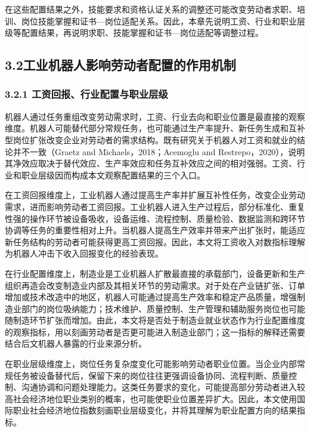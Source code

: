 在这些配置结果之外，技能要求和资格认证关系的调整还可能改变劳动者求职、培训、岗位技能掌握和证书---岗位适配关系。因此，本章先说明工资、行业和职业层级等配置结果，再说明求职、技能掌握和证书---岗位适配等调整过程。

\subsection{3.2工业机器人影响劳动者配置的作用机制}\label{ux5de5ux4e1aux673aux5668ux4ebaux5f71ux54cdux52b3ux52a8ux8005ux914dux7f6eux7684ux4f5cux7528ux673aux5236}

\subsubsection{3.2.1 工资回报、行业配置与职业层级}\label{ux5de5ux8d44ux56deux62a5ux884cux4e1aux914dux7f6eux4e0eux804cux4e1aux5c42ux7ea7}

机器人通过任务重组改变劳动需求时，工资、行业去向和职业位置是最直接的观察维度。机器人可能替代部分常规任务，也可能通过生产率提升、新任务生成和互补型岗位扩张改变企业对劳动者的需求结构。既有研究关于机器人对工资和就业的结论并不一致（Graetz and Michaels，2018；Acemoglu and Restrepo，2020），说明其净效应取决于替代效应、生产率效应和任务互补效应之间的相对强弱。工资、行业和职业层级因而构成本文观察配置结果的三个入口。

在工资回报维度上，工业机器人通过提高生产率并扩展互补性任务，改变企业劳动需求，进而影响劳动者工资回报。工业机器人进入生产过程后，部分标准化、重复性强的操作环节被设备吸收，设备运维、流程控制、质量检验、数据监测和跨环节协调等任务的重要性相对上升。当机器人提高生产效率并带来产出扩张时，能适应新任务结构的劳动者可能获得更高工资回报。因此，本文将工资收入对数指标理解为机器人冲击下收入回报变化的经验表现。

在行业配置维度上，制造业是工业机器人扩散最直接的承载部门，设备更新和生产组织再造会改变制造业内部及其相关环节的劳动需求。对于处在产业链扩张、订单增加或技术改造中的地区，机器人可能通过提高生产效率和稳定产品质量，增强制造业部门的岗位吸纳能力；技术维护、质量控制、生产管理和辅助服务岗位也可能随制造环节扩张而增加。由此，本文将是否处于制造业就业状态作为行业配置维度的观察指标，用以刻画劳动者是否更可能进入制造业部门；这一指标的解释还需要结合后文机器人暴露的行业来源分析。

在职业层级维度上，岗位任务复杂度变化可能影响劳动者职业位置。当企业内部常规任务被设备替代后，保留下来的岗位往往更强调设备协同、流程判断、质量控制、沟通协调和问题处理能力。这类任务要求的变化，可能提高部分劳动者进入较高社会经济地位职业类别的概率，也可能使职业位置差异扩大。因此，本文使用国际职业社会经济地位指数刻画职业层级变化，并将其理解为职业配置方向的结果指标。

